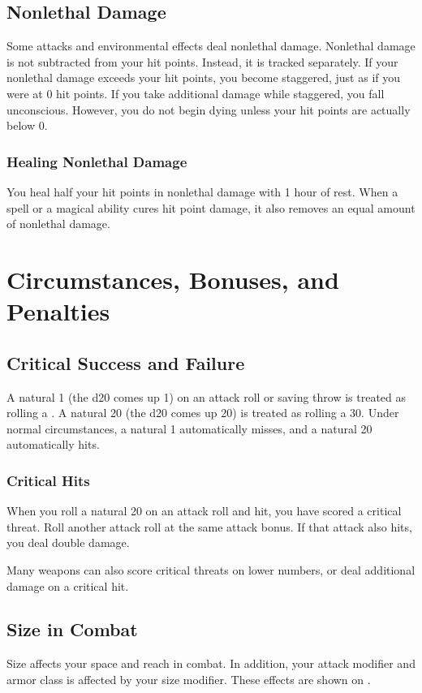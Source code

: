 \subsection{Nonlethal Damage}
Some attacks and environmental effects deal nonlethal damage. Nonlethal damage is not subtracted from your hit points. Instead, it is tracked separately. If your nonlethal damage exceeds your hit points, you become staggered, just as if you were at 0 hit points. If you take additional damage while staggered, you fall unconscious. However, you do not begin dying unless your hit points are actually below 0. 

\subsubsection{Healing Nonlethal Damage}
You heal half your hit points in nonlethal damage with 1 hour of rest. When a spell or a magical ability cures hit point damage, it also removes an equal amount of nonlethal damage.

\section{Circumstances, Bonuses, and Penalties}

\subsection{Critical Success and Failure}
A natural 1 (the d20 comes up 1) on an attack roll or saving throw is treated as rolling a . A natural 20 (the d20 comes up 20) is treated as rolling a 30. Under normal circumstances, a natural 1 automatically misses, and a natural 20 automatically hits.

\subsubsection{Critical Hits}
When you roll a natural 20 on an attack roll and hit, you have scored a critical threat. Roll another attack roll at the same attack bonus. If that attack also hits, you deal double damage.

Many weapons can also score critical threats on lower numbers, or deal additional damage on a critical hit.

\subsection{Size in Combat}
Size affects your space and reach in combat. In addition, your attack modifier and armor class is affected by your size modifier. These effects are shown on . 

